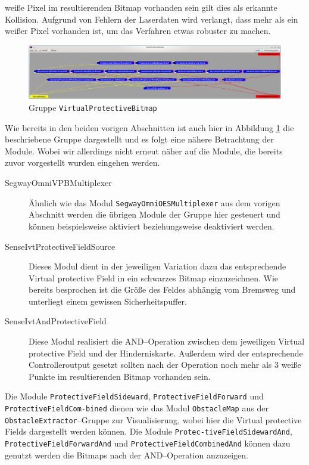  weiße Pixel im resultierenden Bitmap vorhanden sein gilt dies als erkannte Kollision. Aufgrund von Fehlern der Laserdaten wird verlangt, dass mehr als ein
 weißer Pixel vorhanden ist, um das Verfahren etwas robuster zu machen.
\begin{figure}[h]
\center
\includegraphics[scale=0.29]{graphics/VirtualProtectiveBitmap.jpg}
\caption{\label{fig:virtualprotectivebitmap} Gruppe \lstinline{VirtualProtectiveBitmap}}
\end{figure}
 Wie bereits in den beiden vorigen Abschnitten  ist auch hier in Abbildung
 \ref{fig:virtualprotectivebitmap} die beschriebene Gruppe dargestellt und es
 folgt eine nähere Betrachtung der Module.
 Wobei wir allerdings nicht erneut näher auf die Module, die bereits zuvor
 vorgestellt wurden eingehen werden.

\begin{description}
\item[SegwayOmniVPBMultiplexer] Ähnlich wie das Modul
\lstinline{SegwayOmniOESMultiplexer} aus dem vorigen Abschnitt werden die
 übrigen Module der Gruppe hier gesteuert und können beispielsweise aktiviert
 beziehungsweise deaktiviert werden.
\item[SenseIvtProtectiveFieldSource] Dieses Modul dient in der jeweiligen
Variation dazu das entsprechende Virtual protective Field in ein schwarzes
Bitmap einzuzeichnen. Wie bereits besprochen ist die Größe des Feldes abhängig
vom Bremsweg und unterliegt einem gewissen Sicherheitspuffer.
\item[SenseIvtAndProtectiveField]  Diese Modul realisiert die AND--Operation zwischen dem jeweiligen
 Virtual protective Field und der Hinderniskarte. Außerdem wird der entsprechende Controlleroutput gesetzt
 sollten nach der Operation noch mehr als 3 weiße Punkte im resultierenden Bitmap vorhanden sein.
\end{description}

Die Module \lstinline{ProtectiveFieldSideward},
 \lstinline{ProtectiveFieldForward} und
 \lstinline{ProtectiveFieldCom-}\lstinline{bined} dienen wie das Modul
 \lstinline{ObstacleMap} aus der \lstinline{ObstacleExtractor}--Gruppe zur Visualisierung, wobei hier die Virtual
 protective Fields dargestellt werden können. Die Module 
 \lstinline{Protec-tiveField}\lstinline{SidewardAnd},
 \lstinline{ProtectiveFieldForwardAnd} und \lstinline{ProtectiveFieldCombinedAnd} können dazu genutzt werden die
 Bitmaps nach der AND--Operation anzuzeigen.
